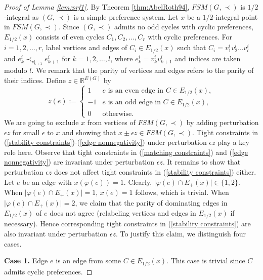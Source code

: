 \documentclass[11pt]{article}
\numberwithin{theorem}{section}
\begin{document}
\begin{proof}[Proof of Lemma \ref{lem:prf1}]
By Theorem \ref{thm:AbelRoth94}, $FSM(G,\prec)$ is $1/2$-integral as $(G,\prec)$ is a simple preference system.
Let $x$ be a $1/2$-integral point in $FSM(G, \prec)$.
Since $(G,\prec)$ admits no odd cycles with cyclic preferences, $E_{1/2}(x)$ consists of even cycles $C_1,C_2,\ldots,C_r$ with cyclic preferences. For $i=1,2,\ldots,r$, label vertices and edges of $C_i\in E_{1/2}(x)$ such that $C_i=v^i_1v^i_2\ldots v^i_{l}$ and $e^i_k\prec_{v^i_{k+1}} e^i_{k+1}$ for $k=1,2,\ldots,l$, where $e^i_k=v^i_{k}v^i_{k+1}$ and indices are taken modulo $l$.
We remark that the parity of vertices and edges refers to the parity of their indices. Define $z\in \mathbb{R}^{E(G)}$ by
\begin{equation*}
z(e):=
\begin{cases}
1 & e\text{ is an even edge in }C \in E_{1/2}(x),\\
-1 & e\text{ is an odd edge in }C \in E_{1/2}(x),\\
0 & \text{otherwise}.
\end{cases}
\end{equation*}
We are going to exclude $x$ from vertices of $FSM(G, \prec)$ by adding perturbation $\epsilon z$ for small $\epsilon$ to $x$ and showing that $x\pm\epsilon z\in FSM(G,\prec)$.
Tight constraints in (\ref{stability constraints})-(\ref{edge nonnegativity}) under perturbation $\epsilon z$ play a key role here. Observe that tight constraints in (\ref{matching constraints}) and (\ref{edge nonnegativity}) are invariant under perturbation $\epsilon z$. It remains to show that perturbation $\epsilon z$ does not affect tight constraints in (\ref{stability constraints}) either. Let $e$ be an edge with $x(\varphi(e))=1$. Clearly, $\lvert \varphi(e)\cap E_+(x)\rvert \in\{1,2\}$. When $\lvert \varphi(e)\cap E_+(x)\rvert=1$, $x(e)=1$ follows, which is trivial. When $\lvert \varphi(e)\cap E_+(x)\rvert =2$, we claim that the parity of dominating edges in $E_{1/2}(x)$ of $e$ does not agree (relabeling vertices and edges in $E_{1/2}(x)$ if necessary).
Hence corresponding tight constraints in (\ref{stability constraints}) are also invariant under perturbation $\epsilon z$.
To justify this claim, we distinguish four cases.

\textbf{Case 1.} Edge $e$ is an edge from some $C\in E_{1/2}(x)$. This case is trivial since $C$ admits cyclic preferences.


\end{proof}
\end{document}
